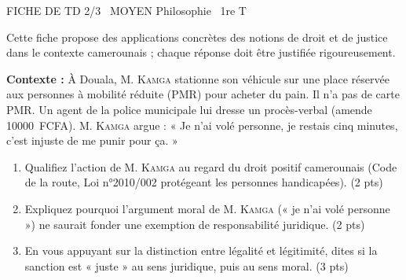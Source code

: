 \documentclass[11pt]{article}
\begin{document}
\begin{tcolorbox}[enhanced,colback=popink,colframe=popink,arc=10pt,boxrule=0pt,left=12pt,right=12pt,top=9pt,bottom=9pt]
{\color{white}\popxbold\small FICHE DE TD 2/3 \textbullet\ MOYEN \hfill Philosophie \textbullet\ 1re T\par}
\end{tcolorbox}
\vspace{4pt}
\noindent Cette fiche propose des applications concrètes des notions de droit et de justice dans le contexte camerounais ; chaque réponse doit être justifiée rigoureusement.

\begin{exercice}
\textbf{Contexte :} À Douala, M. \textsc{Kamga} stationne son véhicule sur une place réservée aux personnes à mobilité réduite (PMR) pour acheter du pain. Il n'a pas de carte PMR. Un agent de la police municipale lui dresse un procès-verbal (amende \SI{10000}{FCFA}). M. \textsc{Kamga} argue : « Je n'ai volé personne, je restais cinq minutes, c'est injuste de me punir pour ça. »
\begin{enumerate}
    \item Qualifiez l'action de M. \textsc{Kamga} au regard du droit positif camerounais (Code de la route, Loi n°2010/002 protégeant les personnes handicapées). (2 pts)
    \item Expliquez pourquoi l'argument moral de M. \textsc{Kamga} (« je n'ai volé personne ») ne saurait fonder une exemption de responsabilité juridique. (2 pts)
    \item En vous appuyant sur la distinction entre légalité et légitimité, dites si la sanction est « juste » au sens juridique, puis au sens moral. (3 pts)
\end{enumerate}
\end{exercice}
\end{document}

